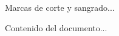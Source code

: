 \documentclass{article}
\begin{document}
\begin{cutout}{0}{0.5\paperwidth}{0pt}{0}
Marcas de corte y sangrado...
\end{cutout}
Contenido del documento...
\end{document}
